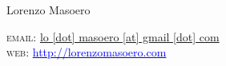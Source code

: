 \documentclass[10pt, a4paper]{article}
\begin{document}
\newcommand{\mm}{\textbf{M}.}

{\LARGE Lorenzo Masoero}\\[.2cm]
 
%
%
\begin{minipage}{0.6\linewidth}
\textsc{email}: \href{mailto:lo.masoero@gmail.com}{lo [dot] masoero [at] gmail [dot] com} \\
 \textsc{web}: \href{http://lorenzomasoero.com}{\textcolor{blue}{http://lorenzomasoero.com}}
\end{minipage}
\par
\end{document}
